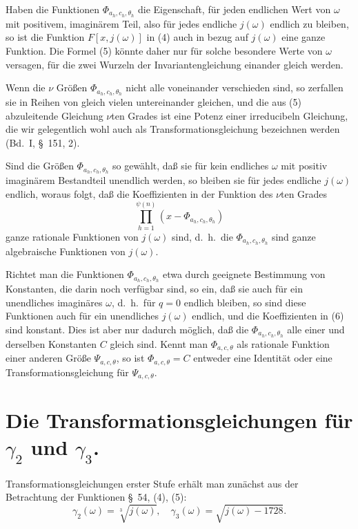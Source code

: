 \documentclass[12pt,a4paper]{article}
\theoremstyle{definition}
\begin{document}
Haben die Funktionen $\Phi_{a_h,c_h,\theta_h}$ die Eigenschaft, für jeden endlichen Wert von $\omega$ mit positivem, imaginärem Teil, also für jedes endliche $j(\omega)$ endlich zu bleiben, so ist die Funktion $F[x, j(\omega)]$ in (4) auch in bezug auf $j(\omega)$ eine ganze Funktion. Die Formel (5) könnte daher nur für solche besondere Werte von $\omega$ versagen, für die zwei Wurzeln der Invariantengleichung einander gleich werden.

Wenn die $\nu$ Größen $\Phi_{a_h,c_h,\theta_h}$ nicht alle voneinander verschieden sind, so zerfallen sie in Reihen von gleich vielen untereinander gleichen, und die aus (5) abzuleitende Gleichung $\nu$ten Grades ist eine Potenz einer irreducibeln Gleichung, die wir gelegentlich wohl auch als Transformationsgleichung bezeichnen werden (Bd.~I, \S\ 151, 2).

Sind die Größen $\Phi_{a_h,c_h,\theta_h}$ so gewählt, daß sie für kein endliches $\omega$ mit positiv imaginärem Bestandteil unendlich werden, so bleiben sie für jedes endliche $j(\omega)$ endlich, woraus folgt, daß die Koeffizienten in der Funktion des $\nu$ten Grades
\begin{equation}\label{eq:70-6}
\prod_{h=1}^{\psi(n)} (x - \Phi_{a_h,c_h,\theta_h})
\end{equation}
ganze rationale Funktionen von $j(\omega)$ sind, d.~h.\ die $\Phi_{a_h,c_h,\theta_h}$ sind ganze algebraische Funktionen von $j(\omega)$.

Richtet man die Funktionen $\Phi_{a_h,c_h,\theta_h}$ etwa durch geeignete Bestimmung von Konstanten, die darin noch verfügbar sind, so ein, daß sie auch für ein unendliches imaginäres $\omega$, d.~h.\ für $q = 0$ endlich bleiben, so sind diese Funktionen auch für ein unendliches $j(\omega)$ endlich, und die Koeffizienten in (6) sind konstant. Dies ist aber nur dadurch möglich, daß die $\Phi_{a_h,c_h,\theta_h}$ alle einer und derselben Konstanten $C$ gleich sind. Kennt man $\Phi_{a,c,\theta}$ als rationale Funktion einer anderen Größe $\Psi_{a,c,\theta}$, so ist $\Phi_{a,c,\theta} = C$ entweder eine Identität oder eine Transformationsgleichung für $\Psi_{a,c,\theta}$.


\section{Die Transformationsgleichungen für $\gamma_2$ und $\gamma_3$.}\label{sec:71}

Transformationsgleichungen erster Stufe erhält man zunächst aus der Betrachtung der Funktionen \S\ 54, (4), (5):
\[
\gamma_2(\omega) = \sqrt[3]{j(\omega)}, \quad \gamma_3(\omega) = \sqrt{j(\omega) - 1728}.
\]
\end{document}
